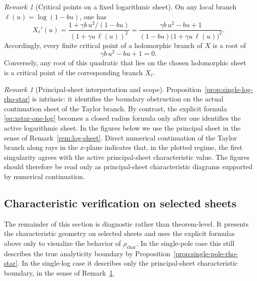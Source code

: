\documentclass[11pt]{amsart}
\numberwithin{equation}{section}
\theoremstyle{plain}
\theoremstyle{definition}
\theoremstyle{remark}
\newtheorem{remark}[theorem]{Remark}
\begin{document}
\begin{remark}[Critical points on a fixed logarithmic sheet]
On any local branch \(\ell(u)=\log(1-bu)\), one has
\[
X_\ell'(u)
=
\frac{1+\gamma b\,u^2/(1-bu)}{(1+\gamma u\,\ell(u))^2}
=
\frac{\gamma b\,u^2-bu+1}
{(1-bu)\bigl(1+\gamma u\,\ell(u)\bigr)^2}.
\]
Accordingly, every finite critical point of a holomorphic branch of \(X\) is a root of
\[
\gamma b\,u^2-bu+1=0.
\]
Conversely, any root of this quadratic that lies on the chosen holomorphic sheet is a
critical point of the corresponding branch \(X_\ell\).
\end{remark}

\begin{remark}[Principal-sheet interpretation and scope]
\label{rem:single-log-principal-sheet}
Proposition~\ref{prop:single-log-rho-star} is intrinsic: it identifies the boundary
obstruction on the actual continuation sheet of the Taylor branch. By contrast, the explicit
formula \eqref{eq:xstar-one-log} becomes a closed radius formula only after one identifies
the active logarithmic sheet. In the figures below we use the principal sheet in the sense
of Remark~\ref{rem:log-sheet}. Direct numerical continuation of the Taylor branch along rays
in the \(x\)-plane indicates that, in the plotted regime, the first singularity agrees with
the active principal-sheet characteristic value. The figures should therefore be read only
as principal-sheet characteristic diagrams supported by numerical continuation.
\end{remark}



\subsection{Characteristic verification on selected sheets}
The remainder of this section is diagnostic rather than theorem-level. It presents the characteristic geometry on selected sheets and uses the explicit
formulas above only to visualize the behavior of
\(\rho_{\mathrm{char}}\). In the single-pole case this still describes the
true analyticity boundary by Proposition~\ref{prop:single-pole-rho-star}. In
the single-log case it describes only the principal-sheet characteristic
boundary, in the sense of Remark~\ref{rem:single-log-principal-sheet}.
\end{document}
